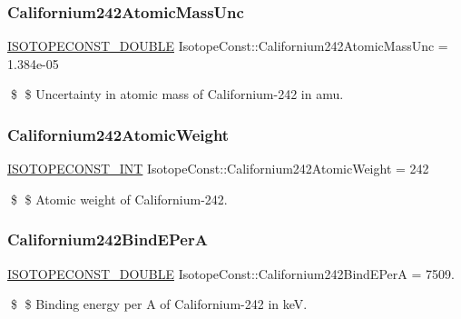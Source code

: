\subsubsection{\texorpdfstring{Californium242\+Atomic\+Mass\+Unc}{Californium242AtomicMassUnc}}
{\footnotesize\ttfamily \mbox{\hyperlink{group___isotope_const-_macros_ga8f45a7272ce02c0b4c65c44636ed719a}{I\+S\+O\+T\+O\+P\+E\+C\+O\+N\+S\+T\+\_\+\+D\+O\+U\+B\+LE}} Isotope\+Const\+::\+Californium242\+Atomic\+Mass\+Unc = 1.\+384e-\/05}

\$ \$ Uncertainty in atomic mass of Californium-\/242 in amu. \mbox{\label{group___isotope_const-_californium-_cf242_ga17ca3a922ad1090fc90deb4e1c0b516f}} 
\subsubsection{\texorpdfstring{Californium242\+Atomic\+Weight}{Californium242AtomicWeight}}
{\footnotesize\ttfamily \mbox{\hyperlink{group___isotope_const-_macros_ga5f18360b3e99483a35c32d789e62621c}{I\+S\+O\+T\+O\+P\+E\+C\+O\+N\+S\+T\+\_\+\+I\+NT}} Isotope\+Const\+::\+Californium242\+Atomic\+Weight = 242}

\$ \$ Atomic weight of Californium-\/242. \mbox{\label{group___isotope_const-_californium-_cf242_gaba69fe236bbf5d408b276b94a6a0138e}} 
\subsubsection{\texorpdfstring{Californium242\+Bind\+E\+PerA}{Californium242BindEPerA}}
{\footnotesize\ttfamily \mbox{\hyperlink{group___isotope_const-_macros_ga8f45a7272ce02c0b4c65c44636ed719a}{I\+S\+O\+T\+O\+P\+E\+C\+O\+N\+S\+T\+\_\+\+D\+O\+U\+B\+LE}} Isotope\+Const\+::\+Californium242\+Bind\+E\+PerA = 7509.}

\$ \$ Binding energy per A of Californium-\/242 in keV. \mbox{\label{group___isotope_const-_californium-_cf242_ga8b08b17fa1fd7680ce5a76aad7aa1903}} 
